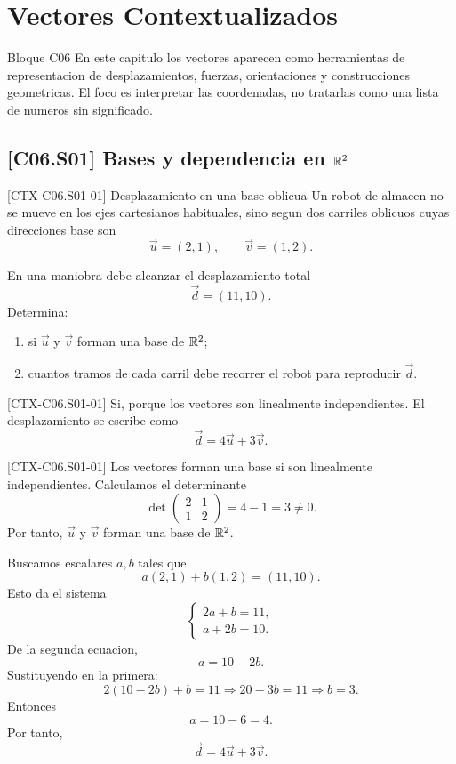 \chapter{Vectores Contextualizados}

\begin{planningbox}{Bloque C06}
En este capitulo los vectores aparecen como herramientas de representacion de desplazamientos,
fuerzas, orientaciones y construcciones geometricas. El foco es interpretar las coordenadas,
no tratarlas como una lista de numeros sin significado.
\end{planningbox}

\section{[C06.S01] Bases y dependencia en \texorpdfstring{\(\mathbb{R}^2\)}{R2}}

\begin{exercise}{[CTX-C06.S01-01] Desplazamiento en una base oblicua}
Un robot de almacen no se mueve en los ejes cartesianos habituales, sino segun dos carriles
oblicuos cuyas direcciones base son
\[
\vec u=(2,1),\qquad \vec v=(1,2).
\]

En una maniobra debe alcanzar el desplazamiento total
\[
\vec d=(11,10).
\]
Determina:
\begin{enumerate}
  \item si \(\vec u\) y \(\vec v\) forman una base de \(\mathbb{R}^2\);
  \item cuantos tramos de cada carril debe recorrer el robot para reproducir \(\vec d\).
\end{enumerate}
\end{exercise}

\begin{shortanswer}{[CTX-C06.S01-01]}
Si, porque los vectores son linealmente independientes. El desplazamiento se escribe como
\[
\vec d=4\vec u+3\vec v.
\]
\end{shortanswer}

\begin{fullsolution}{[CTX-C06.S01-01]}
Los vectores forman una base si son linealmente independientes. Calculamos el determinante
\[
\det\begin{pmatrix}2&1\\1&2\end{pmatrix}=4-1=3\neq 0.
\]
Por tanto, \(\vec u\) y \(\vec v\) forman una base de \(\mathbb{R}^2\).

Buscamos escalares \(a,b\) tales que
\[
a(2,1)+b(1,2)=(11,10).
\]
Esto da el sistema
\[
\begin{cases}
2a+b=11,\\
a+2b=10.
\end{cases}
\]
De la segunda ecuacion,
\[
a=10-2b.
\]
Sustituyendo en la primera:
\[
2(10-2b)+b=11
\Longrightarrow
20-3b=11
\Longrightarrow
b=3.
\]
Entonces
\[
a=10-6=4.
\]
Por tanto,
\[
\vec d=4\vec u+3\vec v.
\]
\end{fullsolution}

